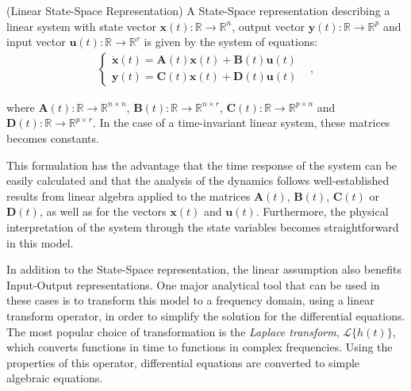 \documentclass[a4paper,11pt]{book}
\numberwithin{figure}{chapter}
\numberwithin{equation}{chapter}
\numberwithin{table}{chapter}
\theoremstyle{definition}
\newtheorem{definition}{Definition}[chapter]
\newcounter{boxed-theorem}
\newcounter{boxed-definition}
\newenvironment{boxed-definition}[1]
{\colorlet{shadecolor}{pastelYellow!15} \begin{shaded} \begin{definition}{#1}}
{\end{definition} \end{shaded}}
\newcounter{boxed-example}
\begin{document}
\begin{boxed-definition}{(Linear State-Space Representation)}
    A State-Space representation describing a linear system with state vector $\bm{x}(t) : \mathbb{R} \rightarrow \mathbb{R}^{n}$, output vector $\bm{y}(t) : \mathbb{R} \rightarrow \mathbb{R}^{p}$ and input vector $\bm{u}(t) : \mathbb{R} \rightarrow \mathbb{R}^{r}$ is given by the system of equations: 
    \begin{align} \label{eq:SSRepr04}
    \begin{cases}
        \dot{\bm{x}}(t) = \bm{A}(t) \bm{x}(t) + \bm{B}(t) \bm{u}(t) & \\
        \bm{y}(t) = \bm{C}(t) \bm{x}(t) + \bm{D}(t) \bm{u}(t) &
    \end{cases}
    ,\end{align}

    \noindent where $\bm{A}(t) : \mathbb{R} \rightarrow \mathbb{R}^{n \times n}$, $\bm{B}(t) : \mathbb{R} \rightarrow \mathbb{R}^{n \times r}$, $\bm{C}(t) : \mathbb{R} \rightarrow \mathbb{R}^{p \times n}$ and $\bm{D}(t) : \mathbb{R} \rightarrow \mathbb{R}^{p \times r}$. In the case of a time-invariant linear system, these matrices becomes constants. 
\end{boxed-definition}

This formulation has the advantage that the time response of the system can be easily calculated and that the analysis of the dynamics follows well-established results from linear algebra applied to the matrices $\bm{A}(t)$, $\bm{B}(t)$, $\bm{C}(t)$ or $\bm{D}(t)$, as well as for the vectors $\bm{x}(t)$ and $\bm{u}(t)$. Furthermore, the physical interpretation of the system through the state variables becomes straightforward in this model.

In addition to the State-Space representation, the linear assumption also benefits Input-Output representations. One major analytical tool that can be used in these cases is to transform this model to a frequency domain, using a linear transform operator, in order to simplify the solution for the differential equations. The most popular choice of transformation is the \textit{Laplace transform}, $\mathcal{L}\{ h(t) \}$, which converts functions in time to functions in complex frequencies. Using the properties of this operator, differential equations are converted to simple algebraic equations.
\end{document}
